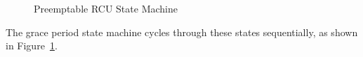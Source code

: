 \begin{figure}[htb]
\begin{center}
\end{center}
\caption{Preemptable RCU State Machine}
\label{app:rcuimpl:Preemptable RCU State Machine}
\end{figure}

The grace period state machine cycles through these states sequentially,
as shown in
Figure~\ref{app:rcuimpl:Preemptable RCU State Machine}.

